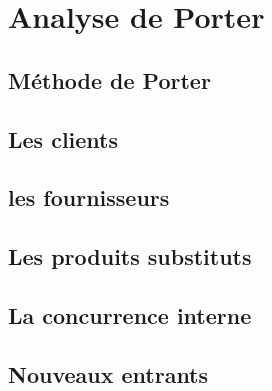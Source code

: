 \section{Analyse de Porter}
\subsection{Méthode de Porter}
\subsection{Les clients}
\subsection{les fournisseurs}
\subsection{Les produits substituts}
\subsection{La concurrence interne}
\subsection{Nouveaux entrants}